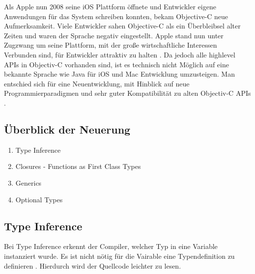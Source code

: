  Als Apple nun 2008 seine iOS Plattform öffnete und Entwickler eigene Anwendungen für das System schreiben konnten, bekam Objective-C neue Aufmerksamkeit. Viele Entwickler sahen Objective-C als ein Überbleibsel alter Zeiten und waren der Sprache negativ eingestellt. Apple stand nun unter Zugzwang um seine Plattform, mit der große wirtschaftliche Interessen Verbunden sind, für Entwickler attraktiv zu halten \cite{Wells:2015fu}. Da jedoch alle highlevel APIs in Objectiv-C vorhanden sind, ist es technisch nicht Möglich auf eine bekannte Sprache wie Java für iOS und Mac Entwicklung umzusteigen. Man entschied sich für eine Neuentwicklung, mit Hinblick auf neue Programmierparadigmen und sehr guter Kompatibilität zu alten Objectiv-C APIs \cite{Wells:2015fu}.

\subsection{Überblick der Neuerung}
\begin{enumerate}
\item Type Inference
\item Closures - Functions as First Class Types
\item Generics
\item Optional Types
\end{enumerate}

\subsection{Type Inference}
Bei Type Inference erkennt der Compiler, welcher Typ in eine Variable instanziert wurde. Es ist nicht nötig für die Vairable eine Typendefinition zu definieren \cite{Apple:2014sp}. Hierdurch wird der Quellcode leichter zu lesen. 


